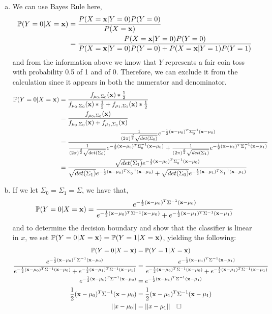 \documentclass[11pt,french,english]{article}
\begin{document}
\begin{enumerate}
\begin{enumerate}[(a)]
    \item We can use Bayes Rule here, \begin{align*}
        \mathbb{P}(Y=0|X=\mathbf{x}) &= \frac{P(X=\mathbf{x}|Y=0)P(Y=0)}{P(X=\mathbf{x})} \\
        &= \frac{P(X=\mathbf{x}|Y=0)P(Y=0)}{P(X=\mathbf{x}|Y=0)P(Y=0) + P(X=\mathbf{x}|Y=1)P(Y=1)}
    \end{align*} and from the information above we know that $Y$ represents a fair coin toss with probability 0.5 of 1 and of 0. Therefore, we can exclude it from the calculation since it appears in both the numerator and denominator.
    \begin{align*}
        \mathbb{P}(Y=0|X=\mathbf{x}) &= \frac{f_{\mu_{0},\Sigma_{0}}(\mathbf{x})*\frac{1}{2}}{f_{\mu_{0},\Sigma_{0}}(\mathbf{x})*\frac{1}{2} + f_{\mu_{1},\Sigma_{1}}(\mathbf{x})*\frac{1}{2}} \\
        &= \frac{f_{\mu_{0},\Sigma_{0}}(\mathbf{x})}{f_{\mu_{0},\Sigma_{0}}(\mathbf{x}) + f_{\mu_{1},\Sigma_{1}}(\mathbf{x})} \\
        &= \frac{\frac{1}{(2\pi)^{\frac{d}{2}}\sqrt{det(\Sigma_{0})}}e^{-\frac{1}{2}(\mathbf{x}-\mu_{0})^{T}\Sigma_{0}^{-1}(\mathbf{x}-\mu_{0})}}{\frac{1}{(2\pi)^{\frac{d}{2}}\sqrt{det(\Sigma_{0})}}e^{-\frac{1}{2}(\mathbf{x}-\mu_{0})^{T}\Sigma_{0}^{-1}(\mathbf{x}-\mu_{0})} + \frac{1}{(2\pi)^{\frac{d}{2}}\sqrt{det(\Sigma_{1})}}e^{-\frac{1}{2}(\mathbf{x}-\mu_{1})^{T}\Sigma_{1}^{-1}(\mathbf{x}-\mu_{1})}}\\
        &= \frac{\sqrt{det(\Sigma_{1})}e^{-\frac{1}{2}(\mathbf{x}-\mu_{0})^{T}\Sigma_{0}^{-1}(\mathbf{x}-\mu_{0})}}{\sqrt{det(\Sigma_{1})}e^{-\frac{1}{2}(\mathbf{x}-\mu_{0})^{T}\Sigma_{0}^{-1}(\mathbf{x}-\mu_{0})} + \sqrt{det(\Sigma_{0})}e^{-\frac{1}{2}(\mathbf{x}-\mu_{1})^{T}\Sigma_{1}^{-1}(\mathbf{x}-\mu_{1})}}
    \end{align*}
    \item If we let $\Sigma_0=\Sigma_1=\Sigma$, we have that, $$\mathbb{P}(Y=0|X=\mathbf{x}) = \frac{e^{-\frac{1}{2}(\mathbf{x}-\mu_{0})^{T}\Sigma^{-1}(\mathbf{x}-\mu_{0})}}{e^{-\frac{1}{2}(\mathbf{x}-\mu_{0})^{T}\Sigma^{-1}(\mathbf{x}-\mu_{0})} + e^{-\frac{1}{2}(\mathbf{x}-\mu_{1})^{T}\Sigma^{-1}(\mathbf{x}-\mu_{1})}}$$ and to determine the decision boundary and show that the classifier is linear in $x$, we set $\mathbb{P}(Y=0|X=\mathbf{x}) = \mathbb{P}(Y=1|X=\mathbf{x})$, yielding the following:
    \begin{align*}
        \mathbb{P}(Y=0|X=\mathbf{x}) &= \mathbb{P}(Y=1|X=\mathbf{x}) \\
        \frac{e^{-\frac{1}{2}(\mathbf{x}-\mu_{0})^{T}\Sigma^{-1}(\mathbf{x}-\mu_{0})}}{e^{-\frac{1}{2}(\mathbf{x}-\mu_{0})^{T}\Sigma^{-1}(\mathbf{x}-\mu_{0})} + e^{-\frac{1}{2}(\mathbf{x}-\mu_{1})^{T}\Sigma^{-1}(\mathbf{x}-\mu_{1})}} &= \frac{e^{-\frac{1}{2}(\mathbf{x}-\mu_{1})^{T}\Sigma^{-1}(\mathbf{x}-\mu_{1})}}{e^{-\frac{1}{2}(\mathbf{x}-\mu_{0})^{T}\Sigma^{-1}(\mathbf{x}-\mu_{0})} + e^{-\frac{1}{2}(\mathbf{x}-\mu_{1})^{T}\Sigma^{-1}(\mathbf{x}-\mu_{1})}} \\
        e^{-\frac{1}{2}(\mathbf{x}-\mu_{0})^{T}\Sigma^{-1}(\mathbf{x}-\mu_{0})} &= e^{-\frac{1}{2}(\mathbf{x}-\mu_{1})^{T}\Sigma^{-1}(\mathbf{x}-\mu_{1})} \\
        \frac{1}{2}(\mathbf{x}-\mu_{0})^{T}\Sigma^{-1}(\mathbf{x}-\mu_{0}) &= \frac{1}{2}(\mathbf{x}-\mu_{1})^{T}\Sigma^{-1}(\mathbf{x}-\mu_{1}) \\
        ||x - \mu_0|| &= ||x - \mu_1|| \quad \square
    \end{align*}
\end{enumerate}

\end{enumerate}

\end{document}
